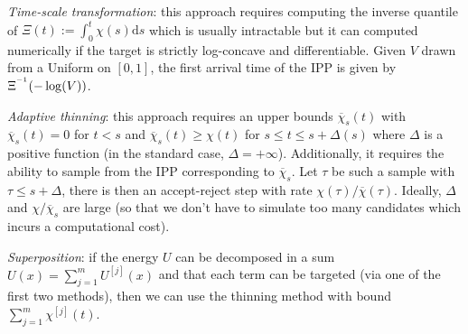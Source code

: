     \emph{Time-scale transformation}: this approach requires computing the inverse quantile of $\Xi(t):=\int_{0}^{t} \chi(s)\mathrm{d}s$ which is usually intractable but it can computed numerically if the target is strictly log-concave and differentiable. Given $V$ drawn from a Uniform on $[0,1]$, the first arrival time of the IPP is given by $\Xi^{^{-1}}(-\log(V))$.
    
    \emph{Adaptive thinning}: this approach requires an upper bounds $\overline{\chi}_{s}(t)$ with $\overline\chi_{s}(t)=0$ for $t<s$ and $\overline\chi_{s}(t)\ge\chi(t)$ for $s\le t\le s+\Delta(s)$ where $\Delta$ is a positive function (in the standard case, $\Delta=+\infty$). Additionally, it requires the ability to sample from the IPP corresponding to $\overline\chi_{s}$. Let $\tau$ be such a sample with $\tau\le s+\Delta$, there is then an accept-reject step with rate $\chi(\tau)/\overline\chi(\tau)$. Ideally, $\Delta$ and $\chi/\overline\chi_{s}$ are large (so that we don't have to simulate too many candidates which incurs a computational cost).
 
    \emph{Superposition}: if the energy $U$ can be decomposed in a sum $U(x)=\sum_{j=1}^{m}U^{[j]}(x)$ and that each term can be targeted (via one of the first two methods), then we can use the thinning method with bound $\sum_{j=1}^{m}\chi^{[j]}(t)$.


%


